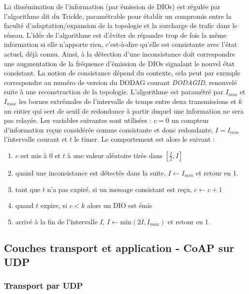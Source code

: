 \documentclass[]{report}
\begin{document}
\par La dissémination de l'information (par émission de DIOs) est régulée par l'algorithme dit du Trickle, paramétrable pour établir un compromis entre la faculté d'adaptation/expansion de la topologie et la surcharge de trafic dans le réseau. L'idée de l'algorithme est d'éviter de répandre trop de fois la même information si elle n'apporte rien, c'est-à-dire qu'elle est consistante avec l'état actuel, déjà connu. Ainsi, à la détection d'une inconsistance doit correspondre une augmentation de la fréquence d'émission de DIOs signalant le nouvel état consistant. La notion de consistance dépend du contexte, cela peut par exemple correspondre au numéro de version du DODAG courant \textit{DODAGID}, renouvelé suite à une reconstruction de la topologie. L'algorithme est paramétré par $I_{min}$ et $I_{max}$ les bornes extrémales de l'intervalle de temps entre deux transmissions et $k$ un entier qui sert de seuil de redondance à partir duquel une information ne sera pas relayée. Les variables suivantes sont utilisées : $c=0$ un compteur d'information reçue considérée comme consistante et donc redondante, $I=I_{min}$ l'intervalle courant et $t$ le timer. Le comportement est alors le suivant :

\begin{enumerate}
\item $c$ est mis à 0 et $t$ à une valeur aléatoire tirée dans $[\frac{I}{2}, I]$
\item quand une inconsistance est détectée dans la suite, $I \leftarrow I_{min}$ et retour en 1.
\item tant que $t$ n'a pas expiré, si un message consistant est reçu, $c \leftarrow c+1$
\item quand $t$ expire, si $c < k$ alors un DIO est émis
\item arrivé à la fin de l'intervalle $I$, $I \leftarrow \text{min}(2I, I_{max})$ et retour en 1.
 
\end{enumerate}

\newpage

	\subsection{Couches transport et application - CoAP sur UDP}
	\label{CoAP}
	
\subsubsection{Transport par UDP}
\end{document}
